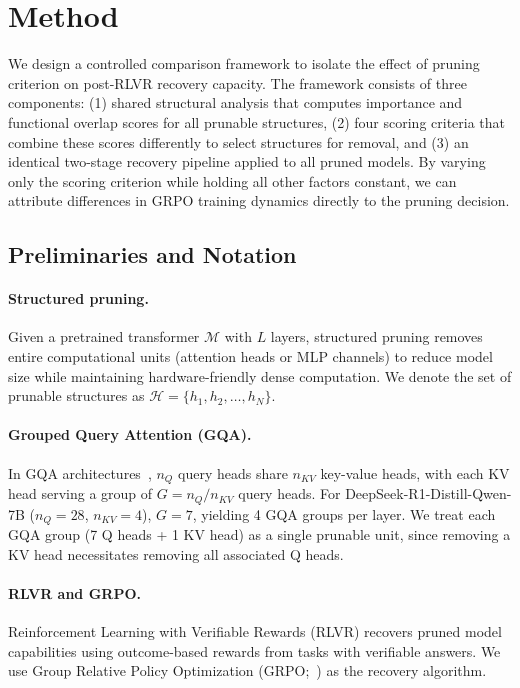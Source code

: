 \section{Method}
\label{sec:method}

We design a controlled comparison framework to isolate the effect of pruning criterion on post-RLVR recovery capacity.
The framework consists of three components: (1) shared structural analysis that computes importance and functional overlap scores for all prunable structures, (2) four scoring criteria that combine these scores differently to select structures for removal, and (3) an identical two-stage recovery pipeline applied to all pruned models.
By varying only the scoring criterion while holding all other factors constant, we can attribute differences in GRPO training dynamics directly to the pruning decision.

\subsection{Preliminaries and Notation}
\label{sec:prelim}

\paragraph{Structured pruning.}
Given a pretrained transformer $\mathcal{M}$ with $L$ layers, structured pruning removes entire computational units (attention heads or MLP channels) to reduce model size while maintaining hardware-friendly dense computation.
We denote the set of prunable structures as $\mathcal{H} = \{h_1, h_2, \ldots, h_N\}$.

\paragraph{Grouped Query Attention (GQA).}
In GQA architectures~\citep{ainslie2023gqa}, $n_Q$ query heads share $n_{KV}$ key-value heads, with each KV head serving a group of $G = n_Q / n_{KV}$ query heads.
For DeepSeek-R1-Distill-Qwen-7B ($n_Q{=}28$, $n_{KV}{=}4$), $G = 7$, yielding 4 GQA groups per layer.
We treat each GQA group (7 Q heads + 1 KV head) as a single prunable unit, since removing a KV head necessitates removing all associated Q heads.

\paragraph{RLVR and GRPO.}
Reinforcement Learning with Verifiable Rewards (RLVR) recovers pruned model capabilities using outcome-based rewards from tasks with verifiable answers.
We use Group Relative Policy Optimization (GRPO;~\citealp{shao2024grpo}) as the recovery algorithm.

